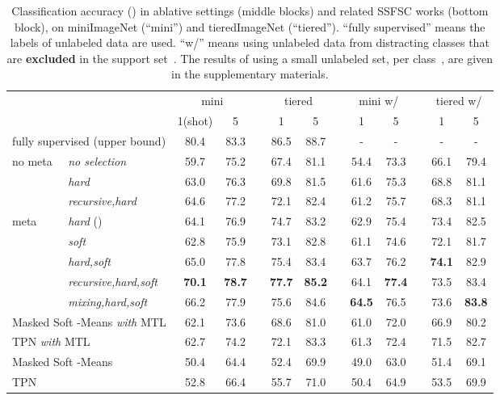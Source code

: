 \documentclass{article}
\begin{document}
 \begin{table*}[t]
\centering
\small
\begin{tabular}{llccccccccccc}
\toprule 
&& \multicolumn{2}{c}{mini}
&& \multicolumn{2}{c}{tiered} && \multicolumn{2}{c}{mini w/}
&& \multicolumn{2}{c}{tiered w/} \\
\cmidrule{3-4}\cmidrule{6-7} \cmidrule{9-10}\cmidrule{12-13}
&& 1(shot) & 5 && 1 & 5 && 1 & 5 && 1 & 5 \\
\midrule[1pt]
\multicolumn{2}{l}{fully supervised (upper bound)} & 80.4 & 83.3 && 86.5 & 88.7  && - & -  && - & -  \\
\midrule[1pt]
\multirow{3}{*}{no meta}& \emph{no selection} & 59.7 & 75.2  && 67.4 & 81.1  && 54.4 & 73.3  && 66.1 & 79.4  \\
&
\emph{hard} & 63.0 & 76.3  && 69.8 & 81.5 && 61.6 & 75.3  && 68.8 & 81.1  \\
&\emph{recursive,hard} & 64.6 & 77.2 && 72.1 & 82.4  && 61.2 & 75.7  && 68.3 & 81.1  \\
\midrule[1pt]
\multirow{5}{*}{meta}&
\emph{hard} () & 64.1 & 76.9  && 74.7 & 83.2  && 62.9 & 75.4  && 73.4 & 82.5  \\
&\emph{soft} & 62.8 & 75.9  && 73.1 & 82.8  && 61.1 & 74.6  && 72.1 & 81.7  \\
&\emph{hard,soft} & 65.0 & 77.8  && 75.4 & 83.4  && 63.7 & 76.2  && \textbf{74.1} & 82.9  \\
&\emph{recursive,hard,soft} & \textbf{70.1} & \textbf{78.7}  && \textbf{77.7} & \textbf{85.2}  && 64.1 & \textbf{77.4}  && 73.5 & 83.4  \\
&\emph{mixing,hard,soft} & 66.2 & 77.9  && 75.6 & 84.6  && \textbf{64.5} & 76.5  && 73.6 & \textbf{83.8}  \\
\midrule[1pt]
\multicolumn{2}{l}{Masked Soft -Means \emph{with} MTL} & 62.1 & 73.6  && 68.6 & 81.0 && 61.0 & 72.0 && 66.9 & 80.2  \\
\multicolumn{2}{l}{TPN \emph{with} MTL} & 62.7 & 74.2  && 72.1 & 83.3  && 61.3 & 72.4 && 71.5 & 82.7  \\
\multicolumn{2}{l}{Masked Soft -Means~\cite{RenICLR2018_semisupervised}} & 50.4 & 64.4  && 52.4 & 69.9 && 49.0 & 63.0 && 51.4 & 69.1  \\
\multicolumn{2}{l}{TPN~\cite{LiuICLR2019transductive}} & 52.8 & 66.4  && 55.7 &  71.0 && 50.4 &  64.9 && 53.5 & 69.9  \\
\bottomrule[1pt]
\end{tabular}
\caption{Classification accuracy () in ablative settings (middle blocks) and related SSFSC works (bottom block), on miniImageNet (``mini'') and tieredImageNet (``tiered'').
``fully supervised'' means the labels of unlabeled data are used. ``w/'' means using unlabeled data from  distracting classes that are \textbf{excluded} in the support set~\cite{LiuICLR2019transductive, RenICLR2018_semisupervised}. 
The results of using a small unlabeled set,  per class~\cite{RenICLR2018_semisupervised}, are given in the supplementary materials.}
\label{table_ablation}
 \vspace{-0.2cm}
\end{table*} 
\end{document}
